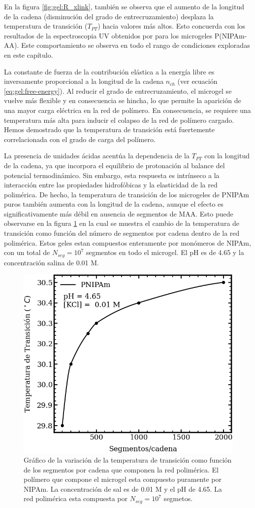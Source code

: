 En la figura \ref{fig:gel:R_xlink}, tambi\'en se observa que el aumento de la longitud de la cadena (disminuci\'on del grado de entrecruzamiento) desplaza la temperatura de transici\'on ($T_{PT}$) hacia valores m\'as altos. Esto concuerda con los resultados de la espectroscopia UV obtenidos por \citet{Lee2008} para los microgeles P(NIPAm-AA). Este comportamiento se observa en todo el rango de condiciones exploradas en este cap\'itulo.

La constante de fuerza de la contribuci\'on el\'astica a la energ\'ia libre es inversamente proporcional a la longitud de la cadena $n_{ch}$ (ver ecuaci\'on \ref{eq:gel:free-energy}). Al reducir el grado de entrecruzamiento, el microgel se vuelve m\'as flexible y en consecuencia se hincha, lo que permite la aparici\'on de una mayor carga el\'ectrica en la red de pol\'imero. En consecuencia, se requiere una temperatura m\'as alta para inducir el colapso de la red de pol\'imero cargado. Hemos demostrado que la temperatura de transici\'on est\'a fuertemente correlacionada con el grado de carga del pol\'imero.

La presencia de unidades \'acidas acent\'ua la dependencia de la $T_{PT}$ con la longitud de la cadena, ya que incorpora el equilibrio de protonaci\'on al balance del potencial termodin\'amico. Sin embargo, esta respuesta es intr\'inseco a la interacci\'on entre las propiedades hidrof\'obicas y la elasticidad de la red polim\'erica. De hecho, la temperatura de transici\'on de los microgeles de PNIPAm puros tambi\'en aumenta con la longitud de la cadena, aunque el efecto es significativamente m\'as d\'ebil en ausencia de segmentos de MAA. Esto puede observarse en la figura \ref{fig:gel:nipam-tran} en la cual se muestra el cambio de la temperatura de transici\'on como funci\'on del n\'umero de segmentos por cadena dentro de la red polim\'erica. Estos geles estan compuestos enteramente por mon\'omeros de NIPAm, con un total de $N_{seg}= 10^7$ segmentos en todo el microgel. El pH es de 4.65 y la concentraci\'on salina de 0.01 M.

\begin{figure}[!tb]
	\centering
	\includegraphics[width=0.45\linewidth]{Figures/graph-gel/nipam-tpt.png}
	\caption{Gr\'afico de la variaci\'on de la temperatura de transici\'on como funci\'on de los segmentos por cadena que componen la red polim\'erica. El pol\'imero que compone el microgel esta compuesto puramente por NIPAm. La concentraci\'on de sal es de 0.01 M y el pH de 4.65. La red polim\'erica esta compuesta por $N_{seg}= 10^7$ segmetos.}
	\label{fig:gel:nipam-tran}
\end{figure}


